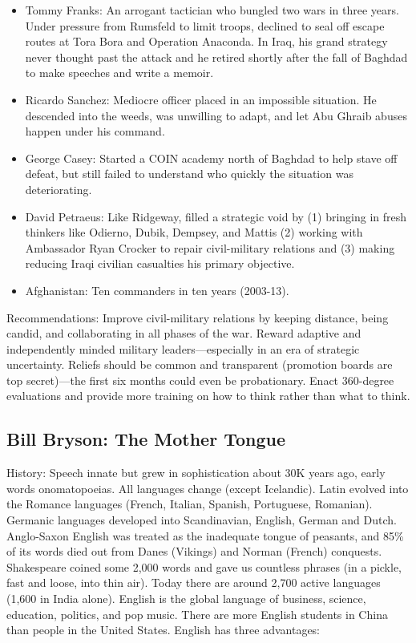 \documentclass[
]{article}
\begin{document}
\begin{itemize}
  \begin{itemize}
  \item
    Tommy Franks: An arrogant tactician who bungled two wars in three
    years. Under pressure from Rumsfeld to limit troops, declined to
    seal off escape routes at Tora Bora and Operation Anaconda. In Iraq,
    his grand strategy never thought past the attack and he retired
    shortly after the fall of Baghdad to make speeches and write a
    memoir.
  \item
    Ricardo Sanchez: Mediocre officer placed in an impossible situation.
    He descended into the weeds, was unwilling to adapt, and let Abu
    Ghraib abuses happen under his command.
  \item
    George Casey: Started a COIN academy north of Baghdad to help stave
    off defeat, but still failed to understand who quickly the situation
    was deteriorating.
  \item
    David Petraeus: Like Ridgeway, filled a strategic void by (1)
    bringing in fresh thinkers like Odierno, Dubik, Dempsey, and Mattis
    (2) working with Ambassador Ryan Crocker to repair civil-military
    relations and (3) making reducing Iraqi civilian casualties his
    primary objective.
  \item
    Afghanistan: Ten commanders in ten years (2003-13).
  \end{itemize}
\end{itemize}

Recommendations: Improve civil-military relations by keeping distance,
being candid, and collaborating in all phases of the war. Reward
adaptive and independently minded military leaders---especially in an
era of strategic uncertainty. Reliefs should be common and transparent
(promotion boards are top secret)---the first six months could even be
probationary. Enact 360-degree evaluations and provide more training on
how to think rather than what to think.

\hypertarget{bill-bryson-the-mother-tongue}{%
\subsection{Bill Bryson: The Mother
Tongue}\label{bill-bryson-the-mother-tongue}}

History: Speech innate but grew in sophistication about 30K years ago,
early words onomatopoeias. All languages change (except Icelandic).
Latin evolved into the Romance languages (French, Italian, Spanish,
Portuguese, Romanian). Germanic languages developed into Scandinavian,
English, German and Dutch. Anglo-Saxon English was treated as the
inadequate tongue of peasants, and 85\% of its words died out from Danes
(Vikings) and Norman (French) conquests. Shakespeare coined some 2,000
words and gave us countless phrases (in a pickle, fast and loose, into
thin air). Today there are around 2,700 active languages (1,600 in India
alone). English is the global language of business, science, education,
politics, and pop music. There are more English students in China than
people in the United States. English has three advantages:
\end{document}
